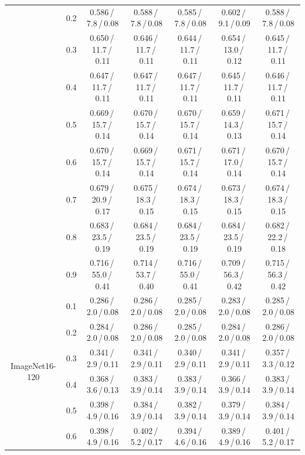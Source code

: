 \begin{table}[!ht]
{\begin{tabular}{clccccc}
         & 0.2 & 0.586\,/\,7.8\,/\,0.08 & 0.588\,/\,7.8\,/\,0.08 & 0.585\,/\,7.8\,/\,0.08 & 0.602\,/\,9.1\,/\,0.09 & 0.588\,/\,7.8\,/\,0.08 \\
         & 0.3 & 0.650\,/\,11.7\,/\,0.11 & 0.646\,/\,11.7\,/\,0.11 & 0.644\,/\,11.7\,/\,0.11 & 0.654\,/\,13.0\,/\,0.12 & 0.645\,/\,11.7\,/\,0.11 \\
         & 0.4 & 0.647\,/\,11.7\,/\,0.11 & 0.647\,/\,11.7\,/\,0.11 & 0.647\,/\,11.7\,/\,0.11 & 0.645\,/\,11.7\,/\,0.11 & 0.646\,/\,11.7\,/\,0.11 \\
         & 0.5 & 0.669\,/\,15.7\,/\,0.14 & 0.670\,/\,15.7\,/\,0.14 & 0.670\,/\,15.7\,/\,0.14 & 0.659\,/\,14.3\,/\,0.13 & 0.671\,/\,15.7\,/\,0.14 \\
         & 0.6 & 0.670\,/\,15.7\,/\,0.14 & 0.669\,/\,15.7\,/\,0.14 & 0.671\,/\,15.7\,/\,0.14 & 0.671\,/\,17.0\,/\,0.14 & 0.670\,/\,15.7\,/\,0.14 \\
         & 0.7 & 0.679\,/\,20.9\,/\,0.17 & 0.675\,/\,18.3\,/\,0.15 & 0.674\,/\,18.3\,/\,0.15 & 0.673\,/\,18.3\,/\,0.15 & 0.674\,/\,18.3\,/\,0.15 \\
         & 0.8 & 0.683\,/\,23.5\,/\,0.19 & 0.684\,/\,23.5\,/\,0.19 & 0.684\,/\,23.5\,/\,0.19 & 0.684\,/\,23.5\,/\,0.19 & 0.682\,/\,22.2\,/\,0.18 \\
         & 0.9 & 0.716\,/\,55.0\,/\,0.41 & 0.714\,/\,53.7\,/\,0.40 & 0.716\,/\,55.0\,/\,0.41 & 0.709\,/\,56.3\,/\,0.42 & 0.715\,/\,56.3\,/\,0.42 \\
        \midrule
        \multirow{9}{*}{ImageNet16-120} & 0.1 & 0.286\,/\,2.0\,/\,0.08 & 0.286\,/\,2.0\,/\,0.08 & 0.285\,/\,2.0\,/\,0.08 & 0.283\,/\,2.0\,/\,0.08 & 0.285\,/\,2.0\,/\,0.08 \\
         & 0.2 & 0.284\,/\,2.0\,/\,0.08 & 0.286\,/\,2.0\,/\,0.08 & 0.285\,/\,2.0\,/\,0.08 & 0.284\,/\,2.0\,/\,0.08 & 0.286\,/\,2.0\,/\,0.08 \\
         & 0.3 & 0.341\,/\,2.9\,/\,0.11 & 0.341\,/\,2.9\,/\,0.11 & 0.340\,/\,2.9\,/\,0.11 & 0.341\,/\,2.9\,/\,0.11 & 0.357\,/\,3.3\,/\,0.12 \\
         & 0.4 & 0.368\,/\,3.6\,/\,0.13 & 0.383\,/\,3.9\,/\,0.14 & 0.383\,/\,3.9\,/\,0.14 & 0.366\,/\,3.9\,/\,0.14 & 0.383\,/\,3.9\,/\,0.14 \\
         & 0.5 & 0.398\,/\,4.9\,/\,0.16 & 0.384\,/\,3.9\,/\,0.14 & 0.382\,/\,3.9\,/\,0.14 & 0.379\,/\,3.9\,/\,0.14 & 0.384\,/\,3.9\,/\,0.14 \\
         & 0.6 & 0.398\,/\,4.9\,/\,0.16 & 0.402\,/\,5.2\,/\,0.17 & 0.394\,/\,4.6\,/\,0.16 & 0.389\,/\,4.9\,/\,0.16 & 0.401\,/\,5.2\,/\,0.17 \\

\end{tabular}}
\end{table}
